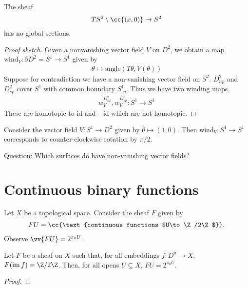 \documentclass{article}
\begin{document}
\begin{theorem}
  The sheaf
  \begin{align*}
    TS^2 \setminus \cc{(x,0)}\to S^2
  \end{align*}
  has no global sections.
  \begin{proof}[Proof sketch]
    Given a nonvanishing vector field $V$ on $D^2$, we obtain a map
    $\text{wind}_V:\partial D^2=S^1 \to S^1$ given by
    \begin{align*}
      \theta \mapsto \text{angle}(T\theta,V(\theta))
    \end{align*}
    Suppose for contradiction we have a non-vanishing vector field
    on $S^2$. $D^2_{np}$ and $D^2_{sp}$ cover $S^1$ with common boundary
    $S^1_{eq}$. Thus we have two winding maps
    \begin{align*}
      w_V^{D^2_{np}},w_V^{D^2_{sp}}:S^1\to S^1
    \end{align*}
    These are homotopic to $\text{id}$ and $-\text{id}$ which are not
    homotopic.
  \end{proof}
\end{theorem}

\begin{example}
  Consider the vector field $V:S^1\to D^2$ given by $\theta\mapsto(1,0)$.
  Then $\text{wind}_V:S^1\to S^1$ corresponds to counter-clockwise rotation
  by $\pi/2$.
\end{example}

Question: Which surfaces do have non-vanishing vector fields?

\section{Continuous binary functions}

Let $X$ be a topological space. Consider the sheaf $F$ given by
\begin{align*}
  FU = \cc{\text{continuous functions $U\to\Z/2\Z$}}.
\end{align*}
Observe $\vv{FU}=2^{\pi_0 U}$.

\begin{proposition}
  Let $F$ be a sheaf on $X$ such that, for all embeddings $f:D^n\to X$,
  $F(\im f)=\Z/2\Z$. Then, for all opens $U\subseteq X$, $FU = 2^{\pi_0 U}$.
  \begin{proof}
    \missingproof
  \end{proof}
\end{proposition}


\printbibliography{}
\end{document}
